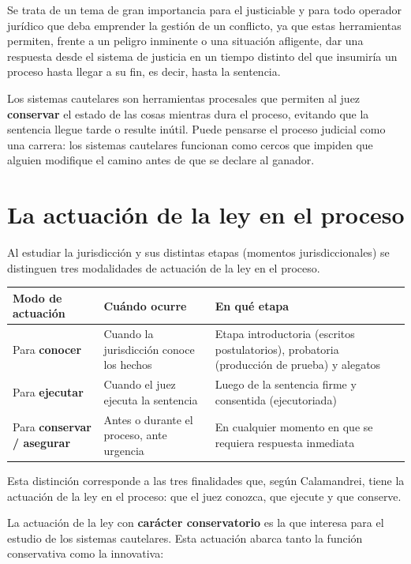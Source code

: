 \documentclass[12pt,oneside]{book}
\begin{document}
Se trata de un tema de gran importancia para el justiciable y para todo operador jurídico que deba emprender la gestión de un conflicto, ya que estas herramientas permiten, frente a un peligro inminente o una situación afligente, dar una respuesta desde el sistema de justicia en un tiempo distinto del que insumiría un proceso hasta llegar a su fin, es decir, hasta la sentencia.

Los sistemas cautelares son herramientas procesales que permiten al juez \textbf{conservar} el estado de las cosas mientras dura el proceso, evitando que la sentencia llegue tarde o resulte inútil. Puede pensarse el proceso judicial como una carrera: los sistemas cautelares funcionan como cercos que impiden que alguien modifique el camino antes de que se declare al ganador.

\section{La actuación de la ley en el proceso}

Al estudiar la jurisdicción y sus distintas etapas (momentos jurisdiccionales) se distinguen tres modalidades de actuación de la ley en el proceso.

\begin{table}[H]
\centering
\small
\begin{tabularx}{\textwidth}{>{\raggedright\arraybackslash}p{} Y Y}
\toprule
\textbf{Modo de actuación} & \textbf{Cuándo ocurre} & \textbf{En qué etapa} \\
\midrule
Para \textbf{conocer} & Cuando la jurisdicción conoce los hechos & Etapa introductoria (escritos postulatorios), probatoria (producción de prueba) y alegatos \\
Para \textbf{ejecutar} & Cuando el juez ejecuta la sentencia & Luego de la sentencia firme y consentida (ejecutoriada) \\
Para \textbf{conservar / asegurar} & Antes o durante el proceso, ante urgencia & En cualquier momento en que se requiera respuesta inmediata \\
\bottomrule
\end{tabularx}
\end{table}

Esta distinción corresponde a las tres finalidades que, según Calamandrei, tiene la actuación de la ley en el proceso: que el juez conozca, que ejecute y que conserve.

La actuación de la ley con \textbf{carácter conservatorio} es la que interesa para el estudio de los sistemas cautelares. Esta actuación abarca tanto la función conservativa como la innovativa:
\end{document}
